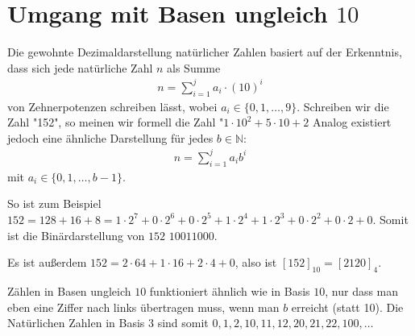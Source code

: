 \documentclass{report}
\newcommand*{\newpar}{\par\vspace{\baselineskip}\noindent}
\newcommand{\bN}{\mathbb{N}}
\begin{document}
	\newtheorem{lemma}{Lemma}[chapter]
	\newtheorem{theorem}[lemma]{Satz}
	\newtheorem{proposition}[lemma]{Proposition}
	\newtheorem{corollary}[lemma]{Korollar}
	\newtheorem{application}[lemma]{Anwendung}
	
	\theoremstyle{definition}
	\newtheorem{definition}[lemma]{Definition}
	\newtheorem{example}[lemma]{Beispiel}

	
	\tableofcontents
	\thispagestyle{fancy}
	\chapter{Umgang mit Basen ungleich $10$}
	Die gewohnte Dezimaldarstellung natürlicher Zahlen basiert auf der Erkenntnis, dass sich jede natürliche Zahl $n$ als Summe
	\begin{align*}
		n = \sum_{i = 1}^j a_i \cdot (10)^i
	\end{align*}
	von Zehnerpotenzen schreiben lässt, wobei $a_i \in \{0,1,\hdots,9\}$.
	Schreiben wir die Zahl "152", so meinen wir formell die Zahl "$1 \cdot 10^2 + 5 \cdot 10 + 2$
	Analog existiert jedoch eine ähnliche Darstellung für jedes $b \in \bN$:
	\begin{align*}
		n = \sum_{i = 1}^j a_i b^i
	\end{align*}
	mit $a_i \in \{0, 1, \hdots, b-1\}$.
	\newpar
	So ist zum Beispiel $152 = 128 + 16 + 8 = 1 \cdot 2^7 + 0 \cdot 2^6 + 0 \cdot 2^5 + 1 \cdot 2^4 + 1 \cdot 2^3 + 0 \cdot 2^2 + 0 \cdot 2 + 0$. Somit ist die Binärdarstellung von $152$ $10011000$.
	\newpar
	Es ist außerdem $152 = 2 \cdot 64 + 1 \cdot 16 + 2 \cdot 4 + 0$, also ist $[152]_{10} = [2120]_4$.
	\newpar
	Zählen in Basen ungleich $10$ funktioniert ähnlich wie in Basis $10$, nur dass man eben eine Ziffer nach links übertragen muss, wenn man $b$ erreicht (statt 10). Die Natürlichen Zahlen in Basis $3$ sind somit $0,1,2,10,11,12,20,21,22,100,\hdots$
\end{document}
